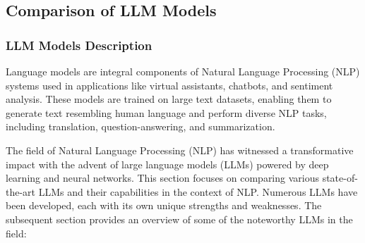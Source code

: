 \documentclass[conference]{IEEEtran}
\begin{document}
\subsection{Comparison of LLM Models}
\subsubsection{LLM Models Description}
Language models are integral components of Natural Language Processing (NLP) systems used in applications like virtual assistants, chatbots, and sentiment analysis. These models are trained on large text datasets, enabling them to generate text resembling human language and perform diverse NLP tasks, including translation, question-answering, and summarization.

The field of Natural Language Processing (NLP) has witnessed a transformative impact with the advent of large language models (LLMs) powered by deep learning and neural networks. This section focuses on comparing various state-of-the-art LLMs and their capabilities in the context of NLP. Numerous LLMs have been developed, each with its own unique strengths and weaknesses. The subsequent section provides an overview of some of the noteworthy LLMs in the field:
\end{document}
